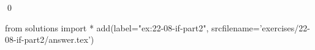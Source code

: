 
\begin{ex}
  \label{ex:22-08-if-part2}
  
  \qed
\end{ex}
\begin{python0}
from solutions import *
add(label="ex:22-08-if-part2",
    srcfilename='exercises/22-08-if-part2/answer.tex')
\end{python0}
